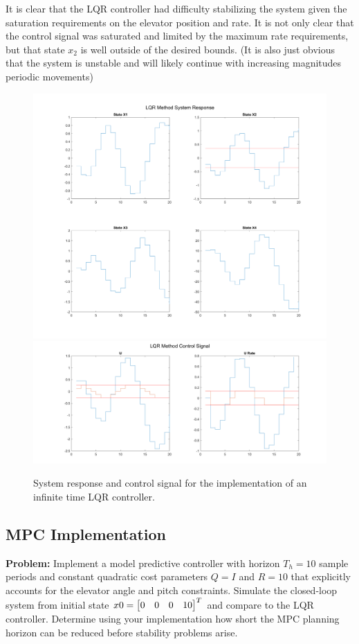 \documentclass[letter]{article}
\begin{document}
It is clear that the LQR controller had difficulty stabilizing the system given the saturation requirements on the elevator position and rate. It is not only clear that the control signal was saturated and limited by the maximum rate requirements, but that state $x_2$ is well outside of the desired bounds. (It is also just obvious that the system is unstable and will likely continue with increasing magnitudes periodic movements)


\begin{figure}[p]
	\centering
	\includegraphics[width=\linewidth]{fig/pblm2_LQR_sys_response}
	\includegraphics[width=\linewidth]{fig/pblm2_LQR_ctrl_signal}
	\caption{System response and control signal for the implementation of an infinite time LQR controller.}
	\label{fig:pblm2lqr}
\end{figure}


\newpage
\subsection{MPC Implementation}
\textbf{Problem:}
Implement a model predictive controller with horizon $T_h = 10$ sample periods and constant quadratic cost parameters $Q = I$ and $R = 10$ that explicitly accounts for the elevator angle and pitch constraints.
Simulate the closed-loop system from initial state $x0 = \mqty[0 &0 &0 &10]^T$ and compare to the LQR controller.
Determine using your implementation how short the MPC planning horizon can be reduced before stability problems arise.\\
\end{document}
